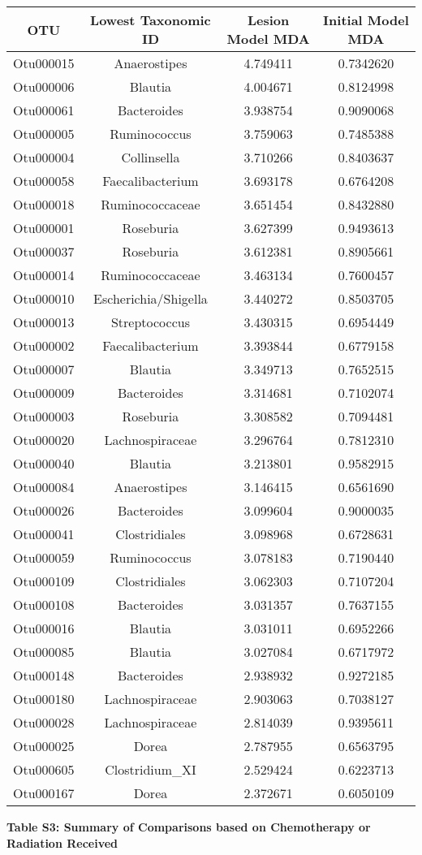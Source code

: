 \documentclass[12pt,]{article}
\begin{document}
\begin{longtable}[]{@{}cccc@{}}
\toprule
OTU & Lowest Taxonomic ID & Lesion Model MDA & Initial Model
MDA\tabularnewline
\midrule
\endhead
Otu000015 & Anaerostipes & 4.749411 & 0.7342620\tabularnewline
Otu000006 & Blautia & 4.004671 & 0.8124998\tabularnewline
Otu000061 & Bacteroides & 3.938754 & 0.9090068\tabularnewline
Otu000005 & Ruminococcus & 3.759063 & 0.7485388\tabularnewline
Otu000004 & Collinsella & 3.710266 & 0.8403637\tabularnewline
Otu000058 & Faecalibacterium & 3.693178 & 0.6764208\tabularnewline
Otu000018 & Ruminococcaceae & 3.651454 & 0.8432880\tabularnewline
Otu000001 & Roseburia & 3.627399 & 0.9493613\tabularnewline
Otu000037 & Roseburia & 3.612381 & 0.8905661\tabularnewline
Otu000014 & Ruminococcaceae & 3.463134 & 0.7600457\tabularnewline
Otu000010 & Escherichia/Shigella & 3.440272 & 0.8503705\tabularnewline
Otu000013 & Streptococcus & 3.430315 & 0.6954449\tabularnewline
Otu000002 & Faecalibacterium & 3.393844 & 0.6779158\tabularnewline
Otu000007 & Blautia & 3.349713 & 0.7652515\tabularnewline
Otu000009 & Bacteroides & 3.314681 & 0.7102074\tabularnewline
Otu000003 & Roseburia & 3.308582 & 0.7094481\tabularnewline
Otu000020 & Lachnospiraceae & 3.296764 & 0.7812310\tabularnewline
Otu000040 & Blautia & 3.213801 & 0.9582915\tabularnewline
Otu000084 & Anaerostipes & 3.146415 & 0.6561690\tabularnewline
Otu000026 & Bacteroides & 3.099604 & 0.9000035\tabularnewline
Otu000041 & Clostridiales & 3.098968 & 0.6728631\tabularnewline
Otu000059 & Ruminococcus & 3.078183 & 0.7190440\tabularnewline
Otu000109 & Clostridiales & 3.062303 & 0.7107204\tabularnewline
Otu000108 & Bacteroides & 3.031357 & 0.7637155\tabularnewline
Otu000016 & Blautia & 3.031011 & 0.6952266\tabularnewline
Otu000085 & Blautia & 3.027084 & 0.6717972\tabularnewline
Otu000148 & Bacteroides & 2.938932 & 0.9272185\tabularnewline
Otu000180 & Lachnospiraceae & 2.903063 & 0.7038127\tabularnewline
Otu000028 & Lachnospiraceae & 2.814039 & 0.9395611\tabularnewline
Otu000025 & Dorea & 2.787955 & 0.6563795\tabularnewline
Otu000605 & Clostridium\_XI & 2.529424 & 0.6223713\tabularnewline
Otu000167 & Dorea & 2.372671 & 0.6050109\tabularnewline
\bottomrule
\end{longtable}

\newpage

\textbf{Table S3: Summary of Comparisons based on Chemotherapy or
Radiation Received}
\end{document}

